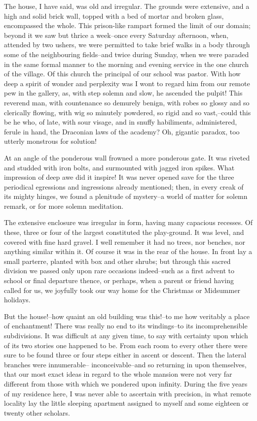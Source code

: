 \documentclass[12pt]{article}
\begin{document}
     The house, I have said, was old and irregular.  The grounds
were extensive, and a high and solid brick wall, topped with
a bed of mortar and broken glass, encompassed the whole.  This
prison-like rampart formed the limit of our domain; beyond it we
saw but thrice a week--once every Saturday afternoon, when,
attended by two ushers, we were permitted to take brief walks in a
body through some of the neighbouring fields--and twice during
Sunday, when we were paraded in the same formal manner to the
morning and evening service in the one church of the village.  Of
this church the principal of our school was pastor.  With how deep
a spirit of wonder and perplexity was I wont to regard him from our
remote pew in the gallery, as, with step solemn and slow, he
ascended the pulpit!  This reverend man, with countenance so
demurely benign, with robes so glossy and so clerically flowing,
with wig so minutely powdered, so rigid and so vast,--could this be
he who, of late, with sour visage, and in snuffy habiliments,
administered, ferule in hand, the Draconian laws of the academy? 
Oh, gigantic paradox, too utterly monstrous for solution!

     At an angle of the ponderous wall frowned a more ponderous
gate.  It was riveted and studded with iron bolts, and surmounted
with jagged iron spikes.  What impression of deep awe did it
inspire!  It was never opened save for the three periodical
egressions and ingressions already mentioned; then, in every creak
of its mighty hinges, we found a plenitude of mystery--a world of
matter for solemn remark, or for more solemn meditation.

     The extensive enclosure was irregular in form, having many
capacious recesses.  Of these, three or four of the largest
constituted the play-ground.  It was level, and covered with fine
hard gravel.  I well remember it had no trees, nor benches, nor
anything similar within it.  Of course it was in the rear of the
house.  In front lay a small parterre, planted with box and other
shrubs; but through this sacred division we passed only upon rare
occasions indeed--such as a first advent to school or final
departure thence, or perhaps, when a parent or friend having called
for us, we joyfully took our way home for the Christmas or
Midsummer holidays.

     But the house!--how quaint an old building was this!--to me
how veritably a place of enchantment!  There was really no end to
its windings--to its incomprehensible subdivisions.  It was
difficult at any given time, to say with certainty upon which of
its two stories one happened to be.  From each room to every
other there were sure to be found three or four steps either in
ascent or descent.  Then the lateral branches were innumerable--
inconceivable--and so returning in upon themselves, that our most
exact ideas in regard to the whole mansion were not very far
different from those with which we pondered upon infinity.  During
the five years of my residence here, I was never able to ascertain
with precision, in what remote locality lay the little sleeping
apartment assigned to myself and some eighteen or twenty other
scholars.
\end{document}
